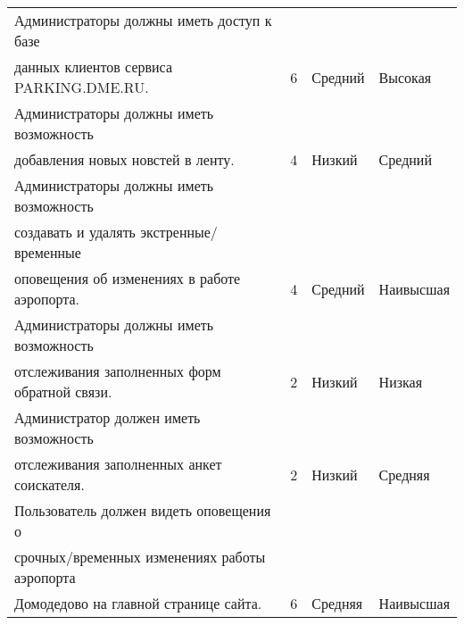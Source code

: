 \begin{table}[h!]
\begin{tabular}{|l|l|l|l|}
    Администраторы должны иметь доступ к базе\\                  данных клиентов сервиса PARKING.DME.RU.                                                                                                                                                                                                                                              & 6            & Средний & Высокая        \\ \hline
    Администраторы должны иметь возможность\\                  добавления новых новстей в ленту.                                                                                                                                                                                                                                                      & 4            & Низкий  & Средний        \\ \hline
    Администраторы должны иметь возможность\\                  создавать и удалять экстренные/временные\\                  оповещения об изменениях в работе аэропорта.                                                                                                                                                                               & 4            & Средний & Наивысшая      \\ \hline
    Администраторы должны иметь возможность\\                  отслеживания заполненных форм обратной связи.                                                                                                                                                                                                                                          & 2            & Низкий  & Низкая         \\ \hline
    Администратор должен иметь возможность\\                  отслеживания заполненных анкет соискателя.                                                                                                                                                                                                                                              & 2            & Низкий  & Средняя        \\ \hline
    Пользователь должен видеть оповещения о\\            срочных/временных изменениях работы аэропорта\\            Домодедово на главной странице сайта.                                                                                                                                                                                             & 6            & Средняя & Наивысшая      \\ \hline

\end{tabular}
\end{table}
